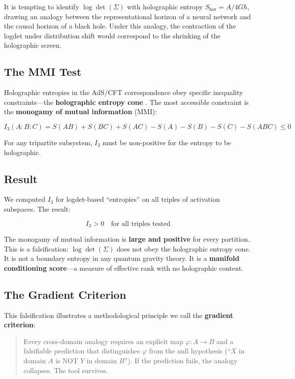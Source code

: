 \documentclass[12pt,a4paper]{article}
\begin{document}
It is tempting to identify $\log\det(\Sigma)$ with holographic entropy $S_\text{hor} = A/4G\hbar$, drawing an analogy between the representational horizon of a neural network and the causal horizon of a black hole. Under this analogy, the contraction of the logdet under distribution shift would correspond to the shrinking of the holographic screen.

\subsection{The MMI Test}

Holographic entropies in the AdS/CFT correspondence obey specific inequality constraints---the \textbf{holographic entropy cone} \cite{bao2015}. The most accessible constraint is the \textbf{monogamy of mutual information} (MMI):

\begin{equation}
I_3(A:B:C) = S(AB) + S(BC) + S(AC) - S(A) - S(B) - S(C) - S(ABC) \leq 0
\end{equation}

For any tripartite subsystem, $I_3$ must be non-positive for the entropy to be holographic.

\subsection{Result}

We computed $I_3$ for logdet-based ``entropies'' on all triples of activation subspaces. The result:

\begin{equation}
I_3 > 0 \quad \text{for all triples tested}
\end{equation}

The monogamy of mutual information is \textbf{large and positive} for every partition. This is a falsification: $\log\det(\Sigma)$ does not obey the holographic entropy cone. It is not a boundary entropy in any quantum gravity theory. It is a \textbf{manifold conditioning score}---a measure of effective rank with no holographic content.

\subsection{The Gradient Criterion}

This falsification illustrates a methodological principle we call the \textbf{gradient criterion}:

\begin{quote}
Every cross-domain analogy requires an explicit map $\varphi: A \to B$ and a falsifiable prediction that distinguishes $\varphi$ from the null hypothesis (``$X$ in domain $A$ is NOT $Y$ in domain $B$''). If the prediction fails, the analogy collapses. The tool survives.
\end{quote}
\end{document}
